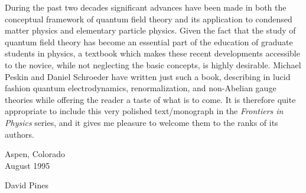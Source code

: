 During the past two decades significant advances have been made in both
the conceptual framework of quantum field theory and its application to
condensed matter physics and elementary particle physics.  Given the fact
that the study of quantum field theory has become an essential part of the
education of graduate students in physics, a textbook which makes these
recent developments accessible to the novice, while not neglecting the
basic concepts, is highly desirable.  Michael Peskin and Daniel Schroeder
have written just such a book, describing in lucid fashion quantum
electrodynamics, renormalization, and non-Abelian gauge theories while
offering the reader a taste of what is to come.  It is therefore quite
appropriate to include this very polished text/monograph in the
\textit{Frontiers in Physics} series, and it gives me pleasure to welcome
them to the ranks of its authors.

\vspace{2em}
\noindent Aspen, Colorado\\
August 1995

\vspace{1em}
\noindent David Pines
